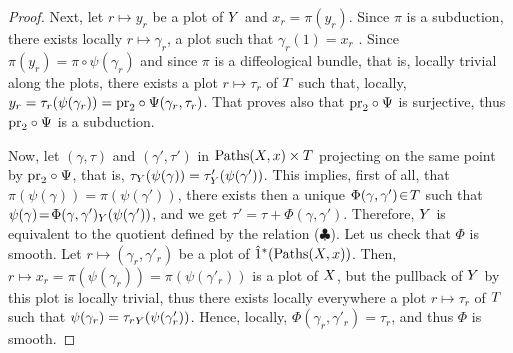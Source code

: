 \begin{proof}
  Next,
  let $r \mapsto y_r$ be a plot of $Y$ and $x_r = \pi(y_r)$.
  Since $\pi$ is a subduction,
  there exists locally $r \mapsto \gamma_r$,
  a plot such that $\gamma_r(1) = x_r$ .
  Since $\pi(y_r) = \pi \circ \psi(\gamma_r)$ and since $\pi$ is a diffeological bundle,
  that is,
  locally trivial along the plots,
  there exists a plot $r \mapsto \tau_r$ of $T$ such that,
  locally,
  $y_r = \tau_r(\psi(\gamma_r))= \mathrm{pr}_2 \circ \Psi(\gamma_r,\tau_r)$.
  That proves also that $\mathrm{pr}_2 \circ \Psi$ is surjective,
  thus $\mathrm{pr}_2 \circ \Psi$ is a subduction.
  
  Now,
  let $(\gamma,\tau)$ and $(\gamma',\tau')$ in $\operatorname{Paths}(X,x) \times T$ projecting on the same point by $\mathrm{pr}_2 \circ \Psi$,
  that is,
  $\tau_Y(\psi(\gamma)) = \tau'_Y(\psi(\gamma'))$.
  This implies,
  first of all,
  that $\pi(\psi(\gamma)) = \pi(\psi(\gamma'))$,
  there exists then a unique $\Phi(\gamma,\gamma')\! \in\! T$ such that $\psi(\gamma)\! =\! \Phi(\gamma,\gamma')_Y(\psi(\gamma'))$,
  and we get $\tau' = \tau + \Phi(\gamma,\gamma')$.
  Therefore,
  $Y$ is equivalent to the quotient defined by the relation ($\clubsuit$).
  Let us check that $\Phi$ is smooth.
  Let $r \mapsto (\gamma_r,\gamma'_r)$ be a plot of $\hat 1^*(\operatorname{Paths}(X,x))$.
  Then,
  $r \mapsto x_r = \pi(\psi(\gamma_r))= \pi(\psi(\gamma'_r))$ is a plot of $X$,
  but the pullback of $Y$ by this plot is locally trivial,
  thus there exists locally everywhere a plot $r \mapsto \tau_r$ of $T$ such that $\psi(\gamma_r)= {\tau_r}_Y(\psi(\gamma'_r))$.
  Hence,
  locally,
  $\Phi(\gamma_r,\gamma'_r) = \tau_r$,
  and thus $\Phi$ is smooth.
  
  

\end{proof}
